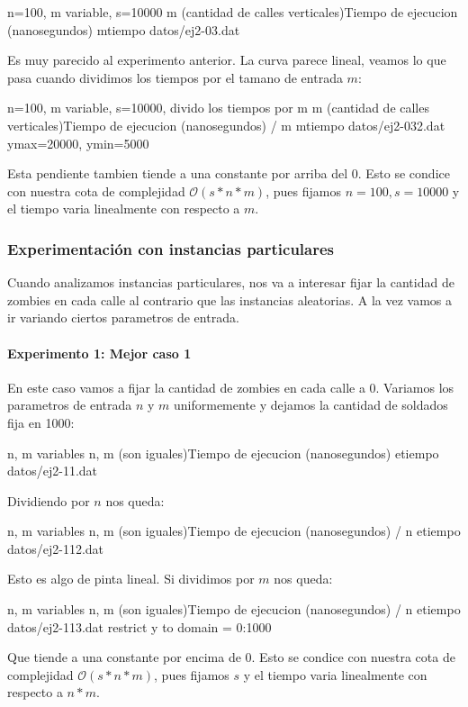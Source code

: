 \graficarDatos
{n=100, m variable, s=10000}
{m (cantidad de calles verticales)}{Tiempo de ejecucion (nanosegundos)}
{m}{tiempo}
{datos/ej2-03.dat}

Es muy parecido al experimento anterior. La curva parece lineal, veamos lo que pasa cuando dividimos los tiempos por el tamano de entrada $m$:

\graficarDatosPlus
{n=100, m variable, s=10000, divido los tiempos por m}
{m (cantidad de calles verticales)}{Tiempo de ejecucion (nanosegundos) / m}
{m}{tiempo}
{datos/ej2-032.dat}
{ymax=20000, ymin=5000}

Esta pendiente tambien tiende a una constante por arriba del 0. Esto se condice con nuestra cota de complejidad $\mathcal{O}(s*n*m)$, pues fijamos $n=100, s=10000$ y el tiempo varia linealmente con respecto a $m$.

\subsubsection{Experimentación con instancias particulares}

Cuando analizamos instancias particulares, nos va a interesar fijar la cantidad de zombies en cada calle al contrario que las instancias aleatorias. A la vez vamos a ir variando ciertos parametros de entrada. 

\paragraph{Experimento 1: Mejor caso 1}

En este caso vamos a fijar la cantidad de zombies en cada calle a 0. Variamos los parametros de entrada $n$ y $m$ uniformemente y dejamos la cantidad de soldados fija en 1000:

\graficarDatos
{n, m variables}
{n, m (son iguales)}{Tiempo de ejecucion (nanosegundos)}
{e}{tiempo}
{datos/ej2-11.dat}

Dividiendo por $n$ nos queda:

\graficarDatos
{n, m variables}
{n, m (son iguales)}{Tiempo de ejecucion (nanosegundos) / n}
{e}{tiempo}
{datos/ej2-112.dat}

Esto es algo de pinta lineal. Si dividimos por $m$ nos queda:

\graficarDatosPlus
{n, m variables}
{n, m (son iguales)}{Tiempo de ejecucion (nanosegundos) / n}
{e}{tiempo}
{datos/ej2-113.dat}
{restrict y to domain = 0:1000}

Que tiende a una constante por encima de 0. Esto se condice con nuestra cota de complejidad $\mathcal{O}(s*n*m)$, pues fijamos $s$ y el tiempo varia linealmente con respecto a $n*m$.

